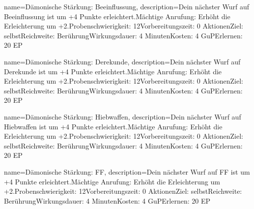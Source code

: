 {
    name={Dämonische Stärkung: Beeinflussung},
    description={Dein nächster Wurf auf Beeinflussung ist um +4 Punkte erleichtert.\newline Mächtige Anrufung: Erhöht die Erleichterung um +2.\newline Probenschwierigkeit: 12\newline Vorbereitungszeit: 0 Aktionen\newline Ziel: selbst\newline Reichweite: Berührung\newline Wirkungsdauer: 4 Minuten\newline Kosten: 4 GuP\newline Erlernen: 20 EP}
}


{
    name={Dämonische Stärkung: Derekunde},
    description={Dein nächster Wurf auf Derekunde ist um +4 Punkte erleichtert.\newline Mächtige Anrufung: Erhöht die Erleichterung um +2.\newline Probenschwierigkeit: 12\newline Vorbereitungszeit: 0 Aktionen\newline Ziel: selbst\newline Reichweite: Berührung\newline Wirkungsdauer: 4 Minuten\newline Kosten: 4 GuP\newline Erlernen: 20 EP}
}


{
    name={Dämonische Stärkung: Hiebwaffen},
    description={Dein nächster Wurf auf Hiebwaffen ist um +4 Punkte erleichtert.\newline Mächtige Anrufung: Erhöht die Erleichterung um +2.\newline Probenschwierigkeit: 12\newline Vorbereitungszeit: 0 Aktionen\newline Ziel: selbst\newline Reichweite: Berührung\newline Wirkungsdauer: 4 Minuten\newline Kosten: 4 GuP\newline Erlernen: 20 EP}
}


{
    name={Dämonische Stärkung: FF},
    description={Dein nächster Wurf auf FF ist um +4 Punkte erleichtert.\newline Mächtige Anrufung: Erhöht die Erleichterung um +2.\newline Probenschwierigkeit: 12\newline Vorbereitungszeit: 0 Aktionen\newline Ziel: selbst\newline Reichweite: Berührung\newline Wirkungsdauer: 4 Minuten\newline Kosten: 4 GuP\newline Erlernen: 20 EP}
}


